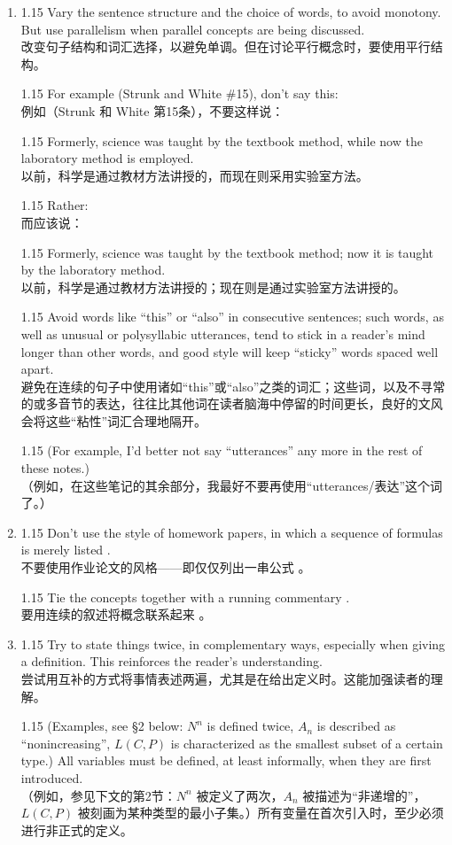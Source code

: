 \documentclass[12pt,a4paper]{article}
\newcommand{\bilingual}[2]{
    \begin{spacing}{1.15} %
        \noindent \normalsize #1 \\[-0.5ex] %
        \small \textcolor{blue!70!black}{#2} %
    \end{spacing}
    \vspace{0.8em} %
}
\begin{document}
\begin{enumerate}
\item \bilingual{Vary the sentence structure and the choice of words, to avoid monotony. But use parallelism when parallel concepts are being discussed.}{改变句子结构和词汇选择，以避免单调。但在讨论平行概念时，要使用平行结构。} %
\bilingual{For example (Strunk and White \#15), don't say this:}{例如（Strunk 和 White 第15条），不要这样说：} %
\bilingual{Formerly, science was taught by the textbook method, while now the laboratory method is employed.}{以前，科学是通过教材方法讲授的，而现在则采用实验室方法。} %
\bilingual{Rather:}{而应该说：} %
\bilingual{Formerly, science was taught by the textbook method; now it is taught by the laboratory method.}{以前，科学是通过教材方法讲授的；现在则是通过实验室方法讲授的。} %
\bilingual{Avoid words like ``this'' or ``also'' in consecutive sentences; such words, as well as unusual or polysyllabic utterances, tend to stick in a reader's mind longer than other words, and good style will keep ``sticky'' words spaced well apart.}{避免在连续的句子中使用诸如“this”或“also”之类的词汇；这些词，以及不寻常的或多音节的表达，往往比其他词在读者脑海中停留的时间更长，良好的文风会将这些“粘性”词汇合理地隔开。} %
\bilingual{(For example, I'd better not say ``utterances'' any more in the rest of these notes.)}{（例如，在这些笔记的其余部分，我最好不要再使用“utterances/表达”这个词了。）} %

\item \bilingual{Don't use the style of homework papers, in which a sequence of formulas is merely listed .}{不要使用作业论文的风格——即仅仅列出一串公式 。}
\bilingual{Tie the concepts together with a running commentary .}{要用连续的叙述将概念联系起来 。}

\item \bilingual{Try to state things twice, in complementary ways, especially when giving a definition. This reinforces the reader's understanding.}{尝试用互补的方式将事情表述两遍，尤其是在给出定义时。这能加强读者的理解。} %
\bilingual{(Examples, see \S 2 below: $N^{n}$ is defined twice, $A_{n}$ is described as ``nonincreasing'', $L(C,P)$ is characterized as the smallest subset of a certain type.) All variables must be defined, at least informally, when they are first introduced.}{（例如，参见下文的第2节：$N^{n}$ 被定义了两次，$A_{n}$ 被描述为“非递增的”，$L(C,P)$ 被刻画为某种类型的最小子集。）所有变量在首次引入时，至少必须进行非正式的定义。} %


\end{enumerate}
\end{document}
